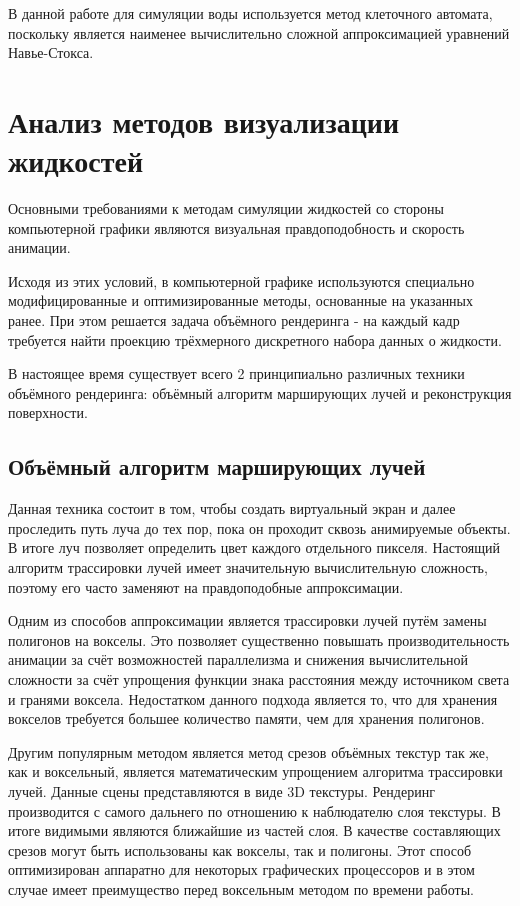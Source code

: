 В данной работе для симуляции воды используется метод клеточного автомата, поскольку
является наименее вычислительно сложной аппроксимацией уравнений Навье-Стокса\cite{conference:cellauto}.

\section{Анализ методов визуализации жидкостей}

Основными требованиями к методам симуляции жидкостей со стороны компьютерной графики
являются визуальная правдоподобность и скорость анимации.

Исходя из этих условий, в компьютерной графике используются специально модифицированные
и оптимизированные методы, основанные на указанных ранее. При этом решается задача объёмного
рендеринга - на каждый кадр требуется найти проекцию трёхмерного дискретного набора данных
о жидкости\cite{article:fastvolume}.

В настоящее время существует всего 2 принципиально различных техники объёмного рендеринга:
объёмный алгоритм марширующих лучей и реконструкция поверхности\cite{book:ash}.

\subsection{Объёмный алгоритм марширующих лучей}

Данная техника состоит в том, чтобы создать виртуальный экран и далее проследить
путь луча до тех пор, пока он проходит сквозь анимируемые объекты. В итоге луч
позволяет определить цвет каждого отдельного пикселя. Настоящий алгоритм трассировки лучей
имеет значительную вычислительную сложность, поэтому его часто заменяют на
правдоподобные аппроксимации\cite{book:ash}.

Одним из способов аппроксимации является трассировки лучей путём
замены полигонов на вокселы. Это позволяет существенно повышать производительность
анимации за счёт возможностей параллелизма и снижения вычислительной сложности за счёт упрощения
функции знака расстояния между источником света и гранями воксела\cite{book:ash}.
Недостатком данного подхода является то, что для хранения вокселов требуется большее количество
памяти, чем для хранения полигонов.

Другим популярным методом является метод срезов объёмных текстур так же, как и воксельный, является математическим упрощением алгоритма трассировки лучей\cite{site:raymarching}.
Данные сцены представляются в виде 3D текстуры. Рендеринг производится с самого дальнего
 по отношению к наблюдателю слоя текстуры. В итоге видимыми являются ближайшие из частей
 слоя.
 В качестве составляющих срезов могут быть использованы как вокселы, так и полигоны.
 Этот способ оптимизирован аппаратно для некоторых графических процессоров
 и в этом случае имеет преимущество перед воксельным методом по времени работы.

